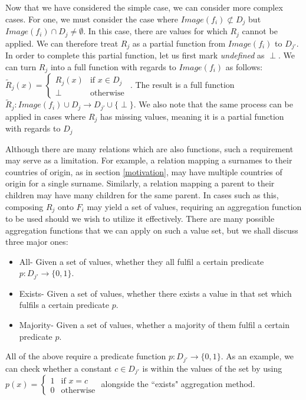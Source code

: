 \documentclass[twoside,11pt]{article}
\theoremstyle{definition}
\begin{document}
Now that we have considered the simple case, we can consider more complex cases.
For one, we must consider the case where $Image(f_i) \not\subset D_j$ but $Image(f_i) \cap D_j \neq\emptyset$. In this case, there are values for which $R_j$ cannot be applied. We can therefore treat $R_j$ as a partial function from $Image(f_i)$ to $D_{j'}$. In order to complete this partial function, let us first mark \emph{undefined} as $\perp$. We can turn $R_j$ into a full function with regards to $Image(f_i)$ as follows: $\tilde{R}_j(x)=\begin{cases} R_j(x) &\mbox{if } x\in D_j\\ 
\perp & \mbox{otherwise } \end{cases}$.
The result is a full function $\tilde{R}_j:Image(f_i)\cup D_j\rightarrow D_{j'}\cup\{\perp\}$. We also note that the same process can be applied in cases where $R_j$  has missing values, meaning it is a partial function with regards to $D_j$

Although there are many relations which are also functions, such a requirement may serve as a limitation. For example, a relation mapping a surnames to their countries of origin, as in section \ref{motivation}, may have multiple countries of origin for a single surname. Similarly, a relation mapping a parent to their children may have many children for the same parent.
In cases such as this, composing $R_j$ onto $F_i$ may yield a set of values, requiring an aggregation function to be used should we wish to utilize it effectively. There are many possible aggregation functions that we can apply on such a value set, but we shall discuss three major ones:
\begin{itemize}
	\item All- Given a set of values, whether they all fulfil a certain predicate $p:D_{j'}\rightarrow\{0,1\}$.
	\item Exists- Given a set of values, whether there exists a value in that set which fulfils a certain predicate $p$.
	\item Majority- Given a set of values, whether a majority of them fulfil a certain predicate $p$.
\end{itemize}
All of the above require a predicate function $p:D_{j'}\rightarrow \{0,1\}$.
As an example, we can check whether a constant $c\in D_{j'}$ is within the values of the set by using $p(x)=\begin{cases}
1 & \mbox{if } x=c\\ 0 & \mbox{otherwise}
\end{cases}$ alongside the ``exists" aggregation method.
\end{document}
